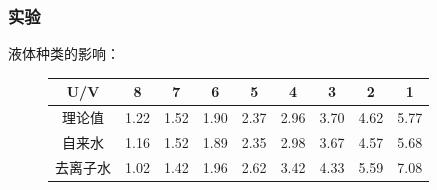 \documentclass{beamer}
\begin{document}
    \begin{frame}
        \frametitle{实验}
        液体种类的影响：
        \begin{figure}
            \caption{16mm水深时自来水和去离子水的测绘结果}
            \begin{table}[]
                \begin{tabular}{|c|c|c|c|c|c|c|c|c|}
                \hline
                U/V  & 8    & 7    & 6    & 5    & 4    & 3    & 2    & 1    \\ \hline
                理论值  & 1.22 & 1.52 & 1.90 & 2.37 & 2.96 & 3.70 & 4.62 & 5.77 \\ \hline
                自来水  & 1.16 & 1.52 & 1.89 & 2.35 & 2.98 & 3.67 & 4.57 & 5.68 \\ \hline
                去离子水 & 1.02 & 1.42 & 1.96 & 2.62 & 3.42 & 4.33 & 5.59 & 7.08 \\ \hline
                \end{tabular}
            \end{table}
        
        \end{figure}
    
    \end{frame}
\end{document}
